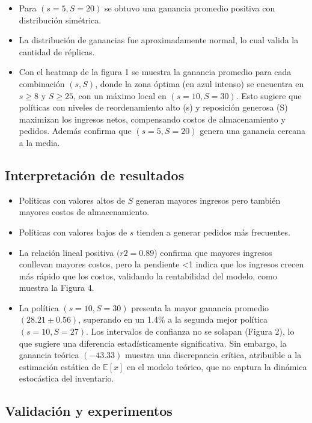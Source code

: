 \documentclass{report}
\begin{document}
\begin{itemize}
\item Para \((s=5, S=20)\) se obtuvo una ganancia promedio positiva con distribución simétrica.
\item La distribución de ganancias fue aproximadamente normal, lo cual valida la cantidad de 
réplicas.
\item Con el heatmap de la figura 1 se muestra la ganancia promedio para cada combinación \((s,S)\), 
donde la zona óptima (en azul intenso) se encuentra en \(s \geq 8\) y \(S \geq 25\), con un máximo 
local en \((s=10, S=30)\). Esto sugiere que políticas con niveles de reordenamiento alto (s) y 
reposición generosa (S) maximizan los ingresos netos, compensando costos de almacenamiento y pedidos. 
Además confirma que \((s=5, S=20)\) genera una ganancia cercana a la media.
\end{itemize}

\subsection*{Interpretación de resultados}

\begin{itemize}
\item Políticas con valores altos de \(S\) generan mayores ingresos pero también mayores 
costos de almacenamiento.
\item Políticas con valores bajos de \(s\) tienden a generar pedidos más frecuentes.
\item La relación lineal positiva \((r2=0.89\)) confirma que mayores ingresos conllevan mayores 
costos, pero la pendiente <1 indica que los ingresos crecen más rápido que los costos, 
validando la rentabilidad del modelo, como muestra la Figura 4.
\item La política \((s=10,S=30)\) presenta la mayor ganancia promedio \((28.21\pm 0.56)\), superando en un 
1.4\% a la segunda mejor política \((s=10,S=27)\). Los intervalos de confianza no se solapan (Figura 2), 
lo que sugiere una diferencia estadísticamente significativa. Sin embargo, la ganancia teórica 
\((-43.33)\) muestra una discrepancia crítica, atribuible a la estimación estática de \(\mathbb{E}[x]\) en el modelo 
teórico, que no captura la dinámica estocástica del inventario.
\end{itemize}

\subsection*{Validación y experimentos}
\end{document}
